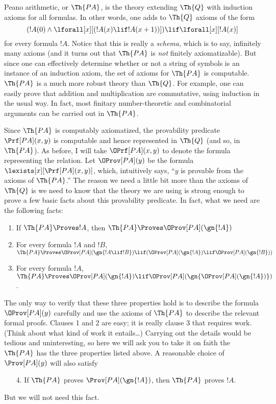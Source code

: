 \documentclass[../../include/open-logic-section]{subfiles}
\begin{document}


Peano arithmetic, or $\Th{PA}$, is the theory extending $\Th{Q}$ with
induction axioms for all formulas. In other words, one adds to $\Th{Q}$
axioms of the form
\[
(!A(0) \land \lforall[x][(!A(x) \lif !A(x+1))]) \lif \lforall[x][!A(x)]
\]
for every formula $!A$. Notice that this is really a {\em schema},
which is to say, infinitely many axioms (and it turns out that
$\Th{PA}$ is {\em not} finitely axiomatizable). But since one can
effectively determine whether or not a string of symbols is an
instance of an induction axiom, the set of axioms for $\Th{PA}$ is
computable. $\Th{PA}$ is a much more robust theory than $\Th{Q}$. For
example, one can easily prove that addition and multiplication are
commutative, using induction in the usual way. In fact, most finitary
number-theoretic and combinatorial arguments can be carried out in
$\Th{PA}$.

Since $\Th{PA}$ is computably axiomatized, the provability predicate
$\Prf[PA](x,y)$ is computable and hence represented in $\Th{Q}$ (and
so, in $\Th{PA}$). As before, I will take $\OPrf[PA](x,y)$ to denote
the formula representing the relation.  Let $\OProv[PA](y)$ be the
formula $\lexists[x][\Prf[PA](x,y)]$, which, intuitively says, ``$y$ is
provable from the axioms of $\Th{PA}$.''  The reason we need a little
bit more than the axioms of $\Th{Q}$ is we need to know that the
theory we are using is strong enough to prove a few basic facts about
this provability predicate. In fact, what we need are the following
facts:
\begin{enumerate}
\item If $\Th{PA} \Proves !A$, then $\Th{PA} \Proves
  \OProv[PA](\gn{!A})$
\item For every formula $!A$ and $!B$, $\Th{PA} \Proves
  \OProv[PA](\gn{!A \lif !B}) \lif (\OProv[PA](\gn{!A}) \lif
  \OProv[PA](\gn{!B}))$
\item For every formula $!A$, $\Th{PA} \Proves \OProv[PA](\gn{!A})
\lif \OProv[PA](\gn{\OProv[PA](\gn{!A})})$.
\end{enumerate}
The only way to verify that these three properties hold is to describe
the formula $\OProv[PA](y)$ carefully and use the axioms of $\Th{PA}$ to
describe the relevant formal proofs. Clauses 1 and 2 are easy; it is
really clause 3 that requires work. (Think about what kind of work it
entails\dots) Carrying out the details would be tedious and
uninteresting, so here we will ask you to take it on faith the
$\Th{PA}$ has the three properties listed above. A reasonable choice
of $\Prov[PA](y)$ will also satisfy
\begin{enumerate}
\item[4.] If $\Th{PA}$ proves $\Prov[PA](\gn{!A})$, then $\Th{PA}$ proves
  $!A$.
\end{enumerate}
But we will not need this fact.
\end{document}
